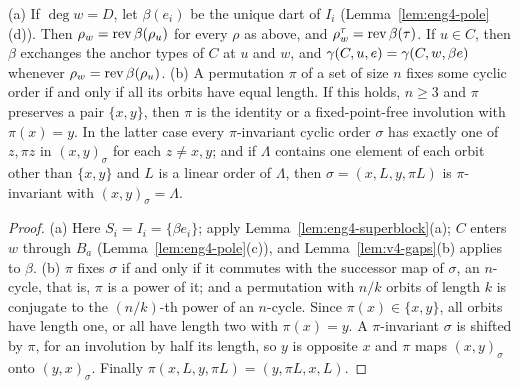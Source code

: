 \begin{lemma}\label{lem:eng4-orbits}
(a) If $\deg w=D$, let $\beta(e_i)$ be the unique dart of $I_i$
(Lemma~\ref{lem:eng4-pole}(d)). Then $\rho_w=\operatorname{rev}\beta(\rho_u)$ for every
$\rho$ as above, and $\rho^\tau_w=\operatorname{rev}\beta(\tau)$. If $u\in C$, then $\beta$
exchanges the anchor types of $C$ at $u$ and $w$, and
$\gamma(C,u,e)=\gamma(C,w,\beta e)$ whenever $\rho_w=\operatorname{rev}\beta(\rho_u)$.
(b) A permutation $\pi$ of a set of size $n$ fixes some cyclic order if and
only if all its orbits have equal length. If this holds, $n\ge3$ and $\pi$
preserves a pair $\{x,y\}$, then $\pi$ is the identity or a fixed-point-free
involution with $\pi(x)=y$. In the latter case every
$\pi$-invariant cyclic order $\sigma$ has exactly one of $z,\pi z$ in
$(x,y)_\sigma$ for each $z\ne x,y$; and if $\Lambda$ contains one element of
each orbit other than $\{x,y\}$ and $L$ is a linear order of $\Lambda$, then
$\sigma=(x,L,y,\pi L)$ is $\pi$-invariant with $(x,y)_\sigma=\Lambda$.
\end{lemma}

\begin{proof}
(a) Here $S_i=I_i=\{\beta e_i\}$; apply Lemma~\ref{lem:eng4-superblock}(a);
$C$ enters $w$ through $B_a$ (Lemma~\ref{lem:eng4-pole}(c)), and
Lemma~\ref{lem:v4-gaps}(b) applies to $\beta$. (b) $\pi$ fixes $\sigma$ if
and only if it commutes with the successor map of $\sigma$, an $n$-cycle,
that is, $\pi$ is a power of it; and a permutation with $n/k$ orbits of
length $k$ is conjugate to the $(n/k)$-th power of an $n$-cycle. Since
$\pi(x)\in\{x,y\}$, all orbits have length one, or all have length two with $\pi(x)=y$. A $\pi$-invariant $\sigma$ is shifted by $\pi$, for an
involution by half its length, so $y$ is opposite $x$ and $\pi$ maps
$(x,y)_\sigma$ onto $(y,x)_\sigma$. Finally $\pi(x,L,y,\pi L)=(y,\pi L,x,L)$.
\end{proof}

